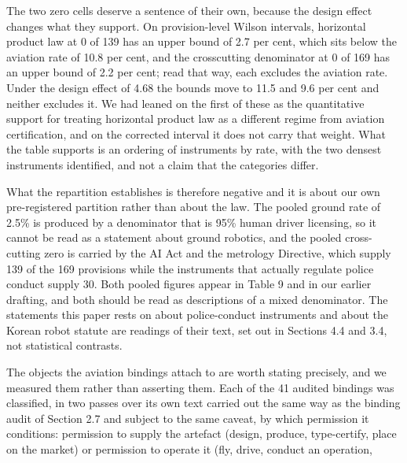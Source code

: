 The two zero cells deserve a sentence of their own, because the design effect changes what they support. On provision-level Wilson intervals, horizontal product law at 0 of 139 has an upper bound of 2.7 per cent, which sits below the aviation rate of 10.8 per cent, and the crosscutting denominator at 0 of 169 has an upper bound of 2.2 per cent; read that way, each excludes the aviation rate. Under the design effect of 4.68 the bounds move to 11.5 and 9.6 per cent and neither excludes it. We had leaned on the first of these as the quantitative support for treating horizontal product law as a different regime from aviation certification, and on the corrected interval it does not carry that weight. What the table supports is an ordering of instruments by rate, with the two densest instruments identified, and not a claim that the categories differ.

What the repartition establishes is therefore negative and it is about our own pre-registered partition rather than about the law. The pooled ground rate of 2.5\% is produced by a denominator that is 95\% human driver licensing, so it cannot be read as a statement about ground robotics, and the pooled cross-cutting zero is carried by the AI Act and the metrology Directive, which supply 139 of the 169 provisions while the instruments that actually regulate police conduct supply 30. Both pooled figures appear in Table 9 and in our earlier drafting, and both should be read as descriptions of a mixed denominator. The statements this paper rests on about police-conduct instruments and about the Korean robot statute are readings of their text, set out in Sections 4.4 and 3.4, not statistical contrasts.

The objects the aviation bindings attach to are worth stating precisely, and we measured them rather than asserting them. Each of the 41 audited bindings was classified, in two passes over its own text carried out the same way as the binding audit of Section 2.7 and subject to the same caveat, by which permission it conditions: permission to supply the artefact (design, produce, type-certify, place on the market) or permission to operate it (fly, drive, conduct an operation,

